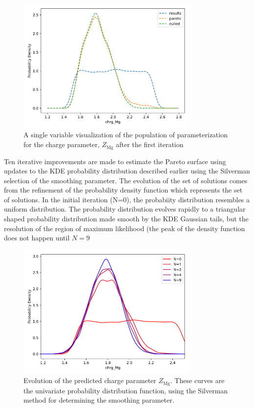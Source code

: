 \begin{figure}[ht]
	\centering
  \includegraphics[width=0.8\textwidth]{chapter7/Z_Mg_iter_0_pareto}
  \caption{A single variable visualization of the population of parameterization for the charge parameter, $Z_{\text{Mg}}$ after the first iteration}
  \label{fig:Z_Mg_iter_0_pareto}
\end{figure}

Ten iterative improvements are made to estimate the Pareto surface using updates to the KDE probability distribution described earlier using the Silverman selection of the smoothing parameter. The evolution of the set of solutions comes from the refinement of the probability density function which represents the set of solutions.  In the initial iteration (N=0), the probabiity distribution resembles a uniform distribution.  The probability distribution evolves rapidly to a triangular shaped probability distribution made smooth by the KDE Gaussian tails, but the resolution of the region of maximum likelihood (the peak of the density function does not happen until $N=9$

\begin{figure}[ht]
	\centering
  \includegraphics[width=0.8\textwidth]{chapter7/Z_Mg_evolution}
  \caption{Evolution of the predicted charge parameter $Z_{\text{Mg}}$.  These curves are the univariate probability distribution function, using the Silverman method for determining the smoothing parameter.}
  \label{fig:Z_Mg_evolution}
\end{figure}

